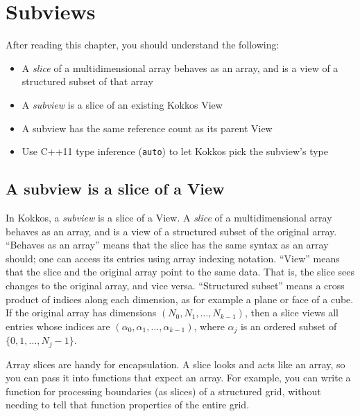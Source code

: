 \chapter{Subviews}\label{C:Subviews}

After reading this chapter, you should understand the following:
\begin{itemize}
\item A \emph{slice} of a multidimensional array behaves as an array,
  and is a view of a structured subset of that array
\item A \emph{subview} is a slice of an existing Kokkos View
\item A subview has the same reference count as its parent View
\item Use C++11 type inference (\lstinline!auto!) to let Kokkos pick the subview's type
\end{itemize}

\section{A subview is a slice of a View}\label{S:Subviews:Slice}

In Kokkos, a \emph{subview} is a slice of a View.  A \emph{slice} of a
multidimensional array behaves as an array, and is a view of a
structured subset of the original array.  ``Behaves as an array''
means that the slice has the same syntax as an array should; one can
access its entries using array indexing notation.  ``View'' means that
the slice and the original array point to the same data.  That is, the
slice sees changes to the original array, and vice versa.
``Structured subset'' means a cross product of indices along each
dimension, as for example a plane or face of a cube.  If the original
array has dimensions $(N_0, N_1, \dots, N_{k-1})$, then a slice views
all entries whose indices are $(\alpha_0, \alpha_1, \dots,
\alpha_{k-1})$, where $\alpha_j$ is an ordered subset of $\{0, 1,
\dots, N_j-1\}$.

Array slices are handy for encapsulation.  A slice looks and acts like
an array, so you can pass it into functions that expect an array.  For
example, you can write a function for processing boundaries (as
slices) of a structured grid, without needing to tell that function
properties of the entire grid.

